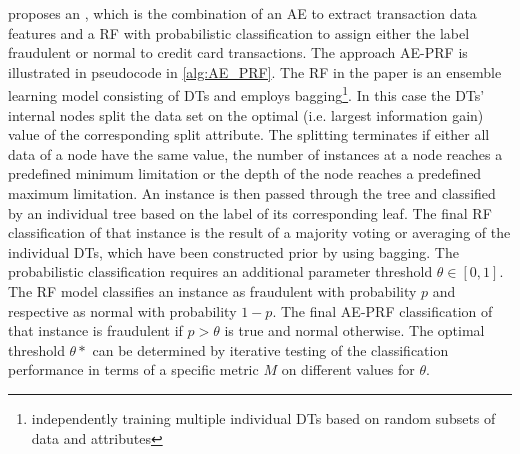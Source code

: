 \cite{AE_RF} proposes an , which is the combination of an \ac{AE} to extract transaction data features and a \ac{RF} with probabilistic classification to assign either the label fraudulent or normal to credit card transactions.
The approach \ac{AE-PRF} is illustrated in pseudocode in \autoref{alg:AE_PRF}.
The \ac{RF} in the paper is an ensemble learning model consisting of \acp{DT} and employs bagging\footnote{independently training multiple individual \acp{DT} based on random subsets of data and attributes}. In this case the \acp{DT}' internal nodes split the data set on the optimal (i.e. largest information gain) value of the corresponding split attribute. 
The splitting terminates if either all data of a node have the same value, the number of instances at a node reaches a predefined minimum limitation or the depth of the node reaches a predefined maximum limitation.
An instance is then passed through the tree and classified by an individual tree based on the label of its corresponding leaf. The final \ac{RF} classification of that instance is the result of a majority voting or averaging of the individual \acp{DT}, which have been constructed prior by using bagging.
The probabilistic classification requires an additional parameter threshold $\theta \in  [0,1]$. The \ac{RF} model classifies an instance as fraudulent with probability $p$ and respective as normal with probability $1 - p$. 
The final \ac{AE-PRF} classification of that instance is fraudulent if $p > \theta$ is true and normal otherwise.
The optimal threshold $\theta*$ can be determined by iterative testing of the classification performance in terms of a specific metric $M$ on different values for $\theta$.
